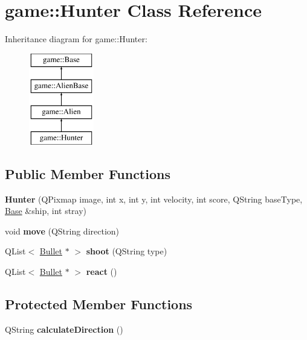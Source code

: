 \hypertarget{classgame_1_1Hunter}{}\section{game\+:\+:Hunter Class Reference}
\label{classgame_1_1Hunter}
Inheritance diagram for game\+:\+:Hunter\+:\begin{figure}[H]
\begin{center}
\leavevmode
\includegraphics[height=4.000000cm]{classgame_1_1Hunter}
\end{center}
\end{figure}
\subsection*{Public Member Functions}
\begin{DoxyCompactItemize}
\item 
\mbox{\label{classgame_1_1Hunter_a5f9f59105e5a25f0a6b2f936737f3a10}} 
{\bfseries Hunter} (Q\+Pixmap image, int x, int y, int velocity, int score, Q\+String base\+Type, \hyperlink{classgame_1_1Base}{Base} \&ship, int stray)
\item 
\mbox{\label{classgame_1_1Hunter_ad0ac31a35cccc2a70481eccad2c10e3a}} 
void {\bfseries move} (Q\+String direction)
\item 
\mbox{\label{classgame_1_1Hunter_a955e3e965209e19256100b3602c3d158}} 
Q\+List$<$ \hyperlink{classgame_1_1Bullet}{Bullet} $\ast$ $>$ {\bfseries shoot} (Q\+String type)
\item 
\mbox{\label{classgame_1_1Hunter_af22d5de5a6fc86ae60190aabf3922064}} 
Q\+List$<$ \hyperlink{classgame_1_1Bullet}{Bullet} $\ast$ $>$ {\bfseries react} ()
\end{DoxyCompactItemize}
\subsection*{Protected Member Functions}
\begin{DoxyCompactItemize}
\item 
\mbox{\label{classgame_1_1Hunter_a0f2031907aed40e5b6da9f329ac42b11}} 
Q\+String {\bfseries calculate\+Direction} ()
\end{DoxyCompactItemize}

